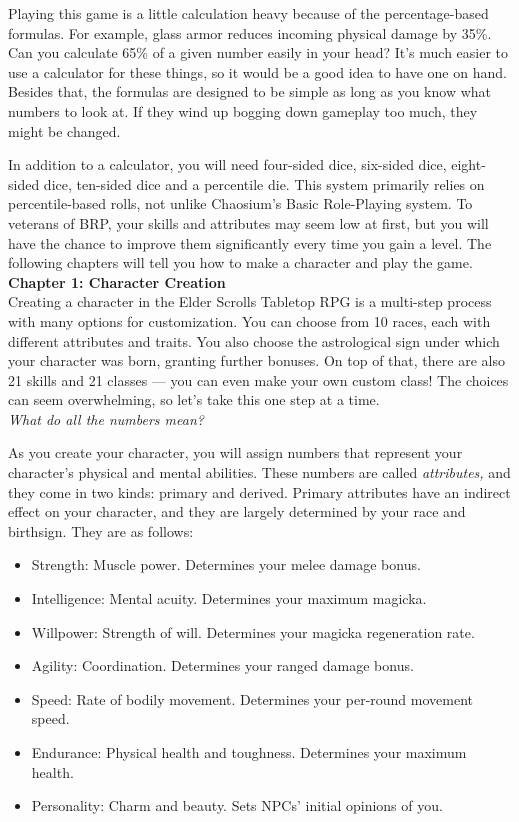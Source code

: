 \documentclass[12pt]{article}
\begin{document}
Playing this game is a little calculation heavy because of the percentage-based formulas. For example, glass armor reduces incoming physical damage by 35\%. Can you calculate 65\% of a given number easily in your head? It's much easier to use a calculator for these things, so it would be a good idea to have one on hand. Besides that, the formulas are designed to be simple as long as you know what numbers to look at. If they wind up bogging down gameplay too much, they might be changed.

In addition to a calculator, you will need four-sided dice, six-sided dice, eight-sided dice, ten-sided dice and a percentile die. This system primarily relies on percentile-based rolls, not unlike Chaosium's Basic Role-Playing system. To veterans of BRP, your skills and attributes may seem low at first, but you will have the chance to improve them significantly every time you gain a level. The following chapters will tell you how to make a character and play the game.
\newpage
\noindent
\textbf{Chapter 1: Character Creation}\\

Creating a character in the Elder Scrolls Tabletop RPG is a multi-step process with many options for customization. You can choose from 10 races, each with different attributes and traits. You also choose the astrological sign under which your character was born, granting further bonuses. On top of that, there are also 21 skills and 21 classes --- you can even make your own custom class! The choices can seem overwhelming, so let's take this one step at a time.\\

\noindent
\textit{What do all the numbers mean?}

As you create your character, you will assign numbers that represent your character's physical and mental abilities. These numbers are called \textit{attributes,} and they come in two kinds: primary and derived. Primary attributes have an indirect effect on your character, and they are largely determined by your race and birthsign. They are as follows:
\begin{itemize}
	\item Strength: Muscle power. Determines your melee damage bonus.
	\item Intelligence: Mental acuity. Determines your maximum magicka.
	\item Willpower: Strength of will. Determines your magicka regeneration rate.
	\item Agility: Coordination. Determines your ranged damage bonus.
	\item Speed: Rate of bodily movement. Determines your per-round movement speed.
	\item Endurance: Physical health and toughness. Determines your maximum health.
	\item Personality: Charm and beauty. Sets NPCs' initial opinions of you.
\end{itemize}
\end{document}
